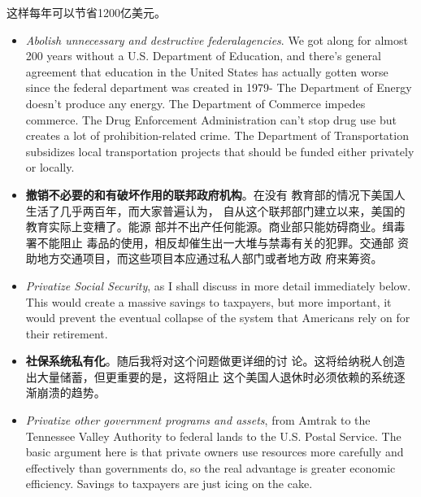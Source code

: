 \begin{paracol}{2}
\begin{itemize}
	这样每年可以节省1200亿美元。
\end{itemize}
\switchcolumn*
\begin{itemize}
	\item \textit{Abolish unnecessary and destructive federalagencies}. We got along
	for almost 200 years without a U.S. Department of Education, and there's general agreement that education in the
	United States has actually gotten worse since the federal department was created in 1979- The Department of Energy
	doesn't produce any energy. The Department of Commerce
	impedes commerce. The Drug Enforcement Administration
	can't stop drug use but creates a lot of prohibition-related
	crime. The Department of Transportation subsidizes local
	transportation projects that should be funded either privately or locally.
\end{itemize}
\switchcolumn
\begin{itemize}
	\item \textbf{撤销不必要的和有破坏作用的联邦政府机构}。在没有
	教育部的情况下美国人生活了几乎两百年，而大家普遍认为，
	自从这个联邦部门建立以来，美国的教育实际上变糟了。能源
	部并不出产任何能源。商业部只能妨碍商业。缉毒署不能阻止
	毒品的使用，相反却催生出一大堆与禁毒有关的犯罪。交通部
	资助地方交通项目，而这些项目本应通过私人部门或者地方政
	府来筹资。
\end{itemize}
\switchcolumn*
\begin{itemize}
	\item \textit{Privatize Social Security}, as I shall discuss in more detail immediately below. This would create a massive savings to taxpayers, but more important, it would prevent the eventual collapse of the system that Americans rely on for their retirement.
\end{itemize}
\switchcolumn
\begin{itemize}
	\item  \textbf{社保系统私有化}。随后我将对这个问题做更详细的讨
	论。这将给纳税人创造出大量储蓄，但更重要的是，这将阻止
	这个美国人退休时必须依赖的系统逐渐崩溃的趋势。
\end{itemize}
\switchcolumn*
\begin{itemize}
	\item \textit{Privatize other government programs and assets}, from Amtrak to
	the Tennessee Valley Authority to federal lands to the U.S.
	Postal Service. The basic argument here is that private owners use resources more carefully and effectively than governments do, so the real advantage is greater economic
	efficiency. Savings to taxpayers are just icing on the cake.

\end{itemize}
\end{paracol}
